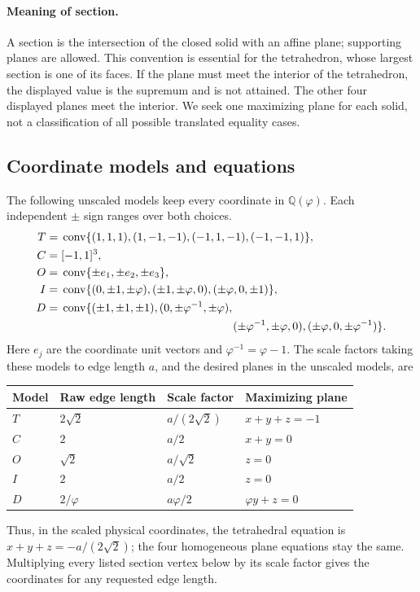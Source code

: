 \documentclass[11pt,letterpaper]{article}
\theoremstyle{definition}\newtheorem{definition}[theorem]{Definition}
\newcommand{\conv}{\operatorname{conv}}
\newcommand{\QQ}{\mathbb Q}
\begin{document}
\paragraph{Meaning of section.}
A section is the intersection of the closed solid with an affine plane;
supporting planes are allowed. This convention is essential for the
tetrahedron, whose largest section is one of its faces. If the plane must
meet the interior of the tetrahedron, the displayed value is the supremum
and is not attained. The other four displayed planes meet the interior.
We seek one maximizing plane for each solid, not a classification of all
possible translated equality cases.

\subsection{Coordinate models and equations}
The following unscaled models keep every coordinate in
$\QQ(\varphi)$. Each independent $\pm$ sign ranges over both choices.
\begin{align*}
T={}&\conv\{(1,1,1),(1,-1,-1),(-1,1,-1),(-1,-1,1)\},\\
C={}&[-1,1]^3,\\
O={}&\conv\{\pm e_1,\pm e_2,\pm e_3\},\\
I={}&\conv\{(0,\pm1,\pm\varphi),(\pm1,\pm\varphi,0),
                       (\pm\varphi,0,\pm1)\},\\
D={}&\conv\{(\pm1,\pm1,\pm1),(0,\pm\varphi^{-1},\pm\varphi),\\
 &\hspace{53mm}(\pm\varphi^{-1},\pm\varphi,0),
                       (\pm\varphi,0,\pm\varphi^{-1})\}.
\end{align*}
Here $e_j$ are the coordinate unit vectors and
$\varphi^{-1}=\varphi-1$. The scale factors taking these models to edge
length $a$, and the desired planes in the unscaled models, are
\begin{center}
\renewcommand{\arraystretch}{1.3}
\begin{tabular}{@{}llll@{}}
\toprule
Model & Raw edge length & Scale factor & Maximizing plane\\
\midrule
$T$ & $2\sqrt2$ & $a/(2\sqrt2)$ & $x+y+z=-1$\\
$C$ & $2$ & $a/2$ & $x+y=0$\\
$O$ & $\sqrt2$ & $a/\sqrt2$ & $z=0$\\
$I$ & $2$ & $a/2$ & $z=0$\\
$D$ & $2/\varphi$ & $a\varphi/2$ & $\varphi y+z=0$\\
\bottomrule
\end{tabular}
\end{center}
Thus, in the scaled physical coordinates, the tetrahedral equation is
$x+y+z=-a/(2\sqrt2)$; the four homogeneous plane equations stay the same.
Multiplying every listed section vertex below by its scale factor gives
the coordinates for any requested edge length.
\end{document}
